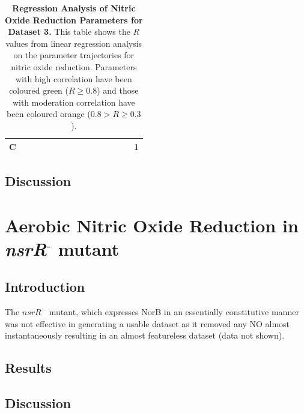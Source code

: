 \begin{table}[p]
{\begin{minipage}{24.4cm}
\begin{tabular}{|c|c|c|c|c|c|c|c|c|c|c|c|c|c|c|}
    \hline
    \cellcolor{dark-gray}C & \cellcolor{light-gray} & \cellcolor{light-gray} & \cellcolor{light-gray} & \cellcolor{light-gray} & \cellcolor{light-gray} & \cellcolor{light-gray} & \cellcolor{light-gray} & \cellcolor{light-gray} & \cellcolor{light-gray} & \cellcolor{light-gray} & \cellcolor{light-gray} & \cellcolor{light-gray} & \cellcolor{light-gray} & \cellcolor{light-gray}1\\
    \hline
  \end{tabular}
  \caption[Regression Analysis of Nitric Oxide Reduction Parameters]{{\bf Regression Analysis of Nitric Oxide Reduction Parameters for Dataset 3.} This table shows the $R$ values from linear regression analysis on the parameter trajectories for nitric oxide reduction. Parameters with high correlation have been coloured green ($R\geq0.8$) and those with moderation correlation have been coloured orange ($0.8>R\geq0.3$).
  \label{tab:noregress1}}
  \end{minipage}
  }
\end{table}
\afterpage{\clearpage}
\subsection{Discussion}
\section{\texorpdfstring{Aerobic Nitric Oxide Reduction in \textit{nsrR$^\textrm{-}$} mutant}{Aerobic Nitric Oxide Reduction in nsrR- mutant}}
\subsection{Introduction}
 The $\mathit{nsrR}^-$ mutant, which expresses NorB in an essentially constitutive manner was not effective in generating a usable dataset as it removed any NO almost instantaneously resulting in an almost featureless dataset (data not shown).
\subsection{Results}
\subsection{Discussion}